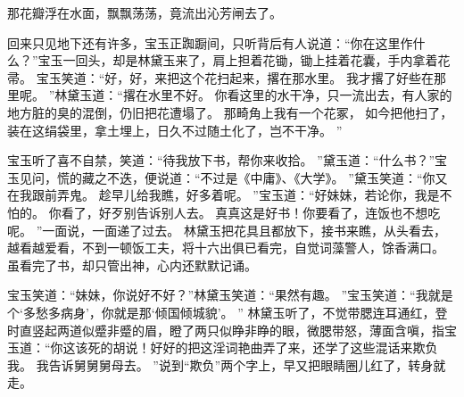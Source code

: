 那花瓣浮在水面，飘飘荡荡，竟流出沁芳闸去了。
\par
回来只见地下还有许多，宝玉正踟蹰间，只听背后有人说道：“你在这里作什么？”宝玉一回头，却是林黛玉来了，肩上担着花锄，锄上挂着花囊，手内拿着花帚。
宝玉笑道：“好，好，来把这个花扫起来，撂在那水里。
我才撂了好些在那里呢。
”林黛玉道：“撂在水里不好。
你看这里的水干净，只一流出去，有人家的地方脏的臭的混倒，仍旧把花遭塌了。
那畸角上我有一个花冢，
如今把他扫了，装在这绢袋里，拿土埋上，日久不过随土化了，岂不干净。
”\par
{}
宝玉听了喜不自禁，笑道：“待我放下书，帮你来收拾。
”黛玉道：“什么书？”宝玉见问，慌的藏之不迭，便说道：“不过是《中庸》、《大学》。
”黛玉笑道：“你又在我跟前弄鬼。
趁早儿给我瞧，好多着呢。
”宝玉道：“好妹妹，若论你，我是不怕的。
你看了，好歹别告诉别人去。
真真这是好书！你要看了，连饭也不想吃呢。
”一面说，一面递了过去。
林黛玉把花具且都放下，接书来瞧，从头看去，越看越爱看，不到一顿饭工夫，将十六出俱已看完，自觉词藻警人，馀香满口。
虽看完了书，却只管出神，心内还默默记诵。
\par
宝玉笑道：“妹妹，你说好不好？”林黛玉笑道：“果然有趣。
”宝玉笑道：“我就是个‘多愁多病身’，你就是那‘倾国倾城貌’。
”
林黛玉听了，不觉带腮连耳通红，登时直竖起两道似蹙非蹙的眉，瞪了两只似睁非睁的眼，微腮带怒，薄面含嗔，指宝玉道：“你这该死的胡说！好好的把这淫词艳曲弄了来，还学了这些混话来欺负我。
我告诉舅舅舅母去。
”说到“欺负”两个字上，早又把眼睛圈儿红了，转身就走。
